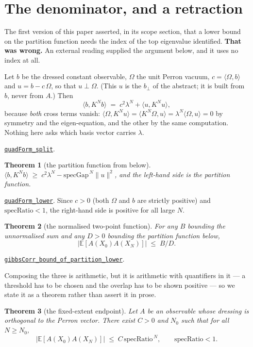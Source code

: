\documentclass[11pt]{article}
\newtheorem{theorem}{Theorem}[section]
\theoremstyle{definition}
\newcommand{\anchor}{9704b3f3c0d576bb40c43caa5360fbd64dfa1643}
\newcommand{\osline}[3]{%
  \href{https://github.com/lluiseriksson/THE-ERIKSSON-PROGRAMME/blob/\anchor/YangMills/OS/#1.lean\#L#2}{\nolinkurl{#3}}}
\newcommand{\Om}{\Omega}
\begin{document}
\section{The denominator, and a retraction}\label{sec:denominator}

The first version of this paper asserted, in its scope section, that a lower
bound on the partition function needs the index of the top eigenvalue
identified.  \textbf{That was wrong.}  An external reading supplied the argument
below, and it uses no index at all.

Let $b$ be the dressed constant observable, $\Om$ the unit Perron vacuum,
$c=\langle\Om,b\rangle$ and $u=b-c\,\Om$, so that $u\perp\Om$.  (This $u$ is the
$b_{\perp}$ of the abstract; it is built from $b$, never from $A$.)  Then
\[
  \langle b,K^{N}b\rangle
  \;=\; c^{2}\lambda^{N}+\langle u,K^{N}u\rangle ,
\]
because \emph{both} cross terms vanish: $\langle\Om,K^{N}u\rangle
=\langle K^{N}\Om,u\rangle=\lambda^{N}\langle\Om,u\rangle=0$ by symmetry and
the eigen-equation, and the other by the same computation.  Nothing here asks
which basis vector carries $\lambda$.

\osline{SpatialSpectral}{580}{quadForm\_split}.

\begin{theorem}[the partition function from below]\label{thm:denom}
$\langle b,K^{N}b\rangle \;\ge\; c^{2}\lambda^{N}
 -\mathrm{specGap}^{\,N}\|u\|^{2}$, and the left-hand side is the partition
function.
\end{theorem}

\osline{SpatialSpectral}{618}{quadForm\_lower}.
Since $c>0$ (both $\Om$ and $b$ are strictly positive) and
$\mathrm{specRatio}<1$, the right-hand side is positive for all large $N$.

\begin{theorem}[the normalised two-point function]\label{thm:corr}
For any $B$ bounding the unnormalised sum and any $D>0$ bounding the partition
function below,
\[
  \bigl|\mathbb{E}[A(X_0)A(X_N)]\bigr|\;\le\;B/D .
\]
\end{theorem}

\osline{SpatialSpectral}{674}{gibbsCorr\_bound\_of\_partition\_lower}.

Composing the three is arithmetic, but it is arithmetic with quantifiers in it
--- a threshold has to be chosen and the overlap has to be shown positive --- so
we state it as a theorem rather than assert it in prose.

\begin{theorem}[the fixed-extent endpoint]\label{thm:fixedL}
Let $A$ be an observable whose dressing is orthogonal to the Perron vector.
There exist $C>0$ and $N_0$ such that for all $N \ge N_0$,
\[
  \bigl|\mathbb{E}[A(X_0)A(X_N)]\bigr|
  \;\le\; C\,\mathrm{specRatio}^{\,N} ,
  \qquad \mathrm{specRatio} < 1 .
\]
\end{theorem}
\end{document}
